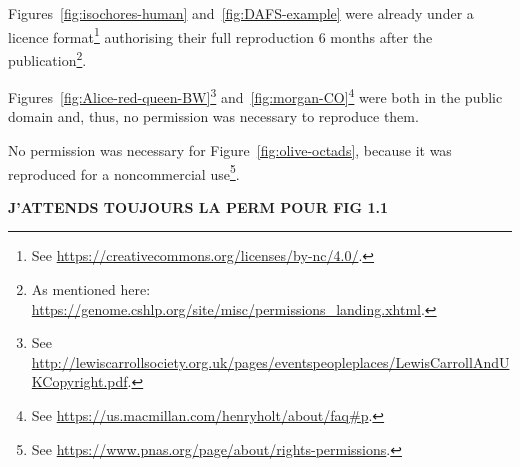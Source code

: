 Figures~\ref{fig:isochores-human} and~\ref{fig:DAFS-example} were already under a licence format\footnote{See \url{https://creativecommons.org/licenses/by-nc/4.0/}.} authorising their full reproduction 6 months after the publication\footnote{As mentioned here: \url{https://genome.cshlp.org/site/misc/permissions_landing.xhtml}.}.

Figures~\ref{fig:Alice-red-queen-BW}\footnote{See \url{http://lewiscarrollsociety.org.uk/pages/eventspeopleplaces/LewisCarrollAndUKCopyright.pdf}.} 
and~\ref{fig:morgan-CO}\footnote{See \url{https://us.macmillan.com/henryholt/about/faq\#p}.}
were both in the public domain and, thus, no permission was necessary to reproduce them.

No permission was necessary for Figure~\ref{fig:olive-octads}, because it was reproduced for a noncommercial use\footnote{See \url{https://www.pnas.org/page/about/rights-permissions}.}.

\textbf{J'ATTENDS TOUJOURS LA PERM POUR FIG 1.1}
%
%
%
%
%
%
%
%




